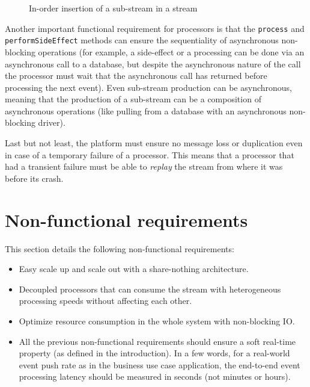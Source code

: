 \begin{figure}[H]
  \begin{center} 
    \caption{In-order insertion of a sub-stream in a stream}
    \label{fig:substream}
  \end{center}
\end{figure}

Another important functional requirement for processors is that the \verb|process| and \verb|performSideEffect| methods can ensure the
sequentiality of asynchronous non-blocking operations (for example, a side-effect or a processing can be done via an asynchronous call to a 
database, but despite the asynchronous nature of the call the processor must wait that the asynchronous call has returned
before processing the next event). Even sub-stream production can be asynchronous, meaning that the production of a sub-stream
can be a composition of asynchronous operations (like pulling from a database with an asynchronous non-blocking driver).

Last but not least, the platform must ensure no message loss or duplication even in case of a temporary failure of a processor. This means that a processor
that had a transient failure must be able to \textit{replay} the stream from where it was before its crash.

\section{Non-functional requirements}

This section details the following non-functional requirements:
\begin{itemize}
  \item Easy scale up and scale out with a share-nothing architecture.
  \item Decoupled processors that can consume the stream with heterogeneous processing speeds without affecting each other.
  \item Optimize resource consumption in the whole system with non-blocking IO.
  \item All the previous non-functional requirements should ensure a soft real-time property (as defined in the introduction). In a few words, for a real-world event push rate as in the business use case application, the end-to-end event processing latency should be measured in seconds (not minutes or hours).
\end{itemize}

